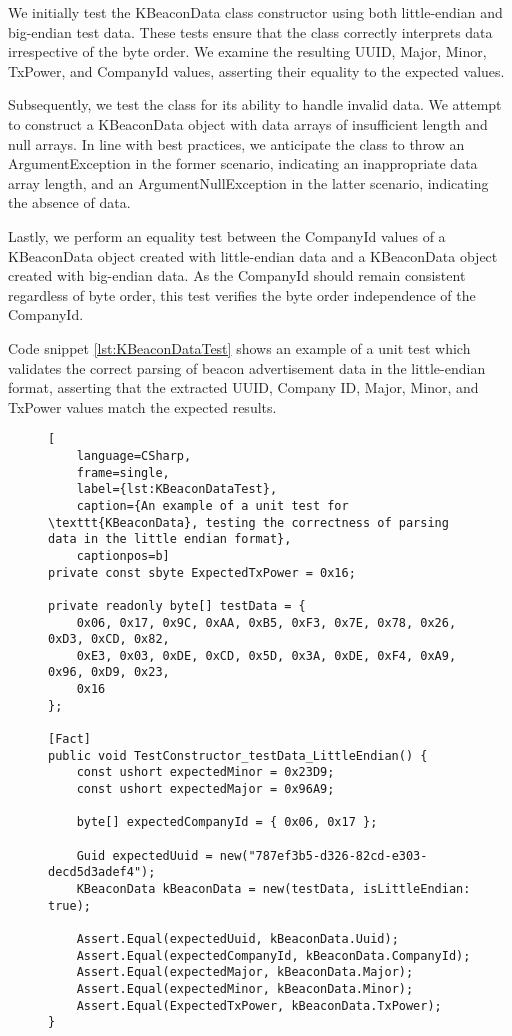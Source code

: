 We initially test the KBeaconData class constructor using both little-endian and big-endian test data. These tests ensure that the class correctly interprets data irrespective of the byte order. We examine the resulting UUID, Major, Minor, TxPower, and CompanyId values, asserting their equality to the expected values.

Subsequently, we test the class for its ability to handle invalid data. We attempt to construct a KBeaconData object with data arrays of insufficient length and null arrays. In line with best practices, we anticipate the class to throw an ArgumentException in the former scenario, indicating an inappropriate data array length, and an ArgumentNullException in the latter scenario, indicating the absence of data.

Lastly, we perform an equality test between the CompanyId values of a KBeaconData object created with little-endian data and a KBeaconData object created with big-endian data. As the CompanyId should remain consistent regardless of byte order, this test verifies the byte order independence of the CompanyId.

Code snippet \ref{lst:KBeaconDataTest} shows an example of a unit test which validates the correct parsing of beacon advertisement data in the little-endian format, asserting that the extracted UUID, Company ID, Major, Minor, and TxPower values match the expected results.

\begin{figure}[h!]
\begin{lstlisting}[
	language=CSharp, 
	frame=single, 
	label={lst:KBeaconDataTest},
	caption={An example of a unit test for \texttt{KBeaconData}, testing the correctness of parsing data in the little endian format}, 
	captionpos=b] 
private const sbyte ExpectedTxPower = 0x16;
	
private readonly byte[] testData = { 
	0x06, 0x17, 0x9C, 0xAA, 0xB5, 0xF3, 0x7E, 0x78, 0x26, 0xD3, 0xCD, 0x82,
	0xE3, 0x03, 0xDE, 0xCD, 0x5D, 0x3A, 0xDE, 0xF4, 0xA9, 0x96, 0xD9, 0x23, 
	0x16 
};

[Fact]
public void TestConstructor_testData_LittleEndian() {
	const ushort expectedMinor = 0x23D9;
	const ushort expectedMajor = 0x96A9;

	byte[] expectedCompanyId = { 0x06, 0x17 };

	Guid expectedUuid = new("787ef3b5-d326-82cd-e303-decd5d3adef4");
	KBeaconData kBeaconData = new(testData, isLittleEndian: true);

	Assert.Equal(expectedUuid, kBeaconData.Uuid);
	Assert.Equal(expectedCompanyId, kBeaconData.CompanyId);
	Assert.Equal(expectedMajor, kBeaconData.Major);
	Assert.Equal(expectedMinor, kBeaconData.Minor);
	Assert.Equal(ExpectedTxPower, kBeaconData.TxPower);
}
\end{lstlisting}
\end{figure}